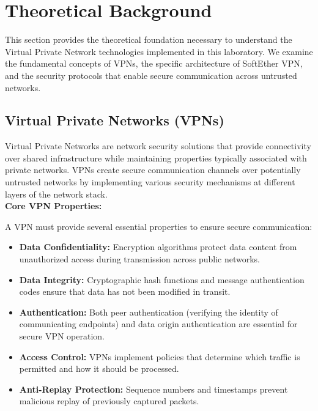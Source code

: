 \newpage

\section{Theoretical Background}

This section provides the theoretical foundation necessary to understand the Virtual Private Network technologies implemented in this laboratory. We examine the fundamental concepts of VPNs, the specific architecture of SoftEther VPN, and the security protocols that enable secure communication across untrusted networks.

\subsection{Virtual Private Networks (VPNs)}

Virtual Private Networks are network security solutions that provide connectivity over shared infrastructure while maintaining properties typically associated with private networks. VPNs create secure communication channels over potentially untrusted networks by implementing various security mechanisms at different layers of the network stack.\\

\noindent
\textbf{Core VPN Properties:}

\noindent
A VPN must provide several essential properties to ensure secure communication:

\begin{itemize}
    \item \textbf{Data Confidentiality:} Encryption algorithms protect data content from unauthorized access during transmission across public networks.
    
    \item \textbf{Data Integrity:} Cryptographic hash functions and message authentication codes ensure that data has not been modified in transit.
    
    \item \textbf{Authentication:} Both peer authentication (verifying the identity of communicating endpoints) and data origin authentication are essential for secure VPN operation.
    
    \item \textbf{Access Control:} VPNs implement policies that determine which traffic is permitted and how it should be processed.
    
    \item \textbf{Anti-Replay Protection:} Sequence numbers and timestamps prevent malicious replay of previously captured packets.
\end{itemize}

